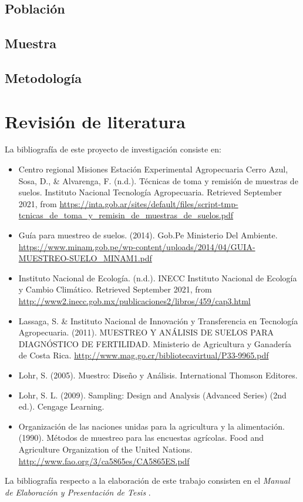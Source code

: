 \documentclass{report}
\begin{document}
\subsection{Población}


\subsection{Muestra}


\subsection{Metodología}


\section{Revisión de literatura}

La bibliografía de este proyecto de investigación consiste en:

\begin{itemize}
    \item Centro regional Misiones Estación Experimental Agropecuaria Cerro Azul, Sosa, D., \& Alvarenga, F. (n.d.). Técnicas de toma y remisión de muestras de suelos. Instituto Nacional Tecnología Agropecuaria. Retrieved September 2021, from \url{https://inta.gob.ar/sites/default/files/script-tmp-tcnicas_de_toma_y_remisin_de_muestras_de_suelos.pdf}
    
    \item Guía para muestreo de suelos. (2014). Gob.Pe Ministerio Del Ambiente. \url{https://www.minam.gob.pe/wp-content/uploads/2014/04/GUIA-MUESTREO-SUELO_MINAM1.pdf}
    
    \item Instituto Nacional de Ecología. (n.d.). INECC Instituto Nacional de Ecología y Cambio Climático. Retrieved September 2021, from \url{http://www2.inecc.gob.mx/publicaciones2/libros/459/cap3.html}
    
    \item Lassaga, S. \& Instituto Nacional de Innovación y Transferencia en Tecnología Agropecuaria. (2011). MUESTREO Y ANÁLISIS DE SUELOS PARA DIAGNÓSTICO DE FERTILIDAD. Ministerio de Agricultura y Ganadería de Costa Rica. \url{http://www.mag.go.cr/bibliotecavirtual/P33-9965.pdf}
    
    \item Lohr, S. (2005). Muestro: Diseño y Análisis. International Thomson Editores.
    
    \item Lohr, S. L. (2009). Sampling: Design and Analysis (Advanced Series) (2nd ed.). Cengage Learning.
    
    \item Organización de las naciones unidas para la agricultura y la alimentación. (1990). Métodos de muestreo para las encuestas agrícolas. Food and Agriculture Organization of the United Nations. \url{http://www.fao.org/3/ca5865es/CA5865ES.pdf}
\end{itemize}

La bibliografía respecto a la elaboración de este trabajo consisten en el \textit{Manual de Elaboración y Presentación de Tesis} \cite{universidad-san-carlos-2016}.

\printbibliography
\end{document}
